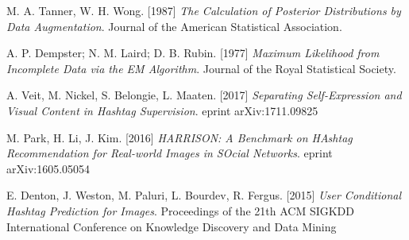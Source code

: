 \begin{thebibliography}{99}
	M. A. Tanner, W. H. Wong. [1987]
	\textit{The Calculation of Posterior Distributions by Data Augmentation}.
	Journal of the American Statistical Association.
	
	A. P. Dempster; N. M. Laird; D. B. Rubin. [1977]
	\textit{Maximum Likelihood from Incomplete Data via the EM Algorithm}.
	Journal of the Royal Statistical Society.
	
	 A. Veit, M. Nickel, S. Belongie, L. Maaten. [2017]
	 \textit{Separating Self-Expression and Visual Content in Hashtag Supervision}.
	 eprint arXiv:1711.09825
	 
	M. Park, H. Li, J. Kim. [2016]
	\textit{HARRISON: A Benchmark on HAshtag Recommendation
	for Real-world Images in SOcial Networks}.
	eprint arXiv:1605.05054
	
	E. Denton, J. Weston, M. Paluri, L. Bourdev, R. Fergus. [2015]
	\textit{User Conditional Hashtag Prediction for Images}.
	Proceedings of the 21th ACM SIGKDD International Conference 
	on Knowledge Discovery and Data Mining
	 
\end{thebibliography}
